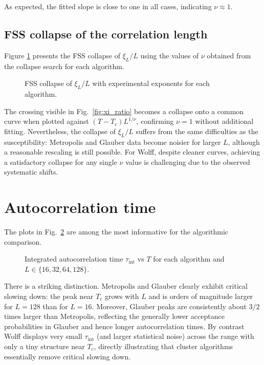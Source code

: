 As expected, the fitted slope is close to one in all cases, indicating $\nu\approx1$.

\subsection{FSS collapse of the correlation length}

Figure \ref{fig:xi_fss} presents the FSS collapse of $\xi_L/L$ using the values of $\nu$ obtained from the collapse search for each algorithm.

\begin{figure}
  \centering
  
  \caption{FSS collapse of $\xi_L/L$ with experimental exponents for each algorithm.}
  \label{fig:xi_fss}
\end{figure}

The crossing visible in Fig.~\ref{fig:xi_ratio} becomes a collapse onto a common curve when plotted against $(T-T_c)L^{1/\nu}$, confirming $\nu=1$ without additional fitting. Nevertheless, the collapse of $\xi_L/L$ suffers from the same difficulties as the susceptibility: Metropolis and Glauber data become noisier for larger $L$, although a reasonable rescaling is still possible. For Wolff, despite cleaner curves, achieving a satisfactory collapse for any single $\nu$ value is challenging due to the observed systematic shifts.

\newpage
\section{Autocorrelation time} \label{sec:tint}

The plots in Fig.~\ref{fig:tint} are among the most informative for the algorithmic comparison.

\begin{figure}
  \centering
  
  \caption{Integrated autocorrelation time $\tau_{\mathrm{int}}$ vs $T$ for each algorithm and $L\in\{16,32,64,128\}$.}
  \label{fig:tint}
\end{figure}


There is a striking distinction. Metropolis and Glauber clearly exhibit critical slowing down: the peak near $T_c$ grows with $L$ and is orders of magnitude larger for $L=128$ than for $L=16$. Moreover, Glauber peaks are consistently about $3/2$ times larger than Metropolis, reflecting the generally lower acceptance probabilities in Glauber and hence longer autocorrelation times. By contrast Wolff displays very small $\tau_{\mathrm{int}}$ (and larger statistical noise) across the range with only a tiny structure near $T_c$, directly illustrating that cluster algorithms essentially remove critical slowing down.


